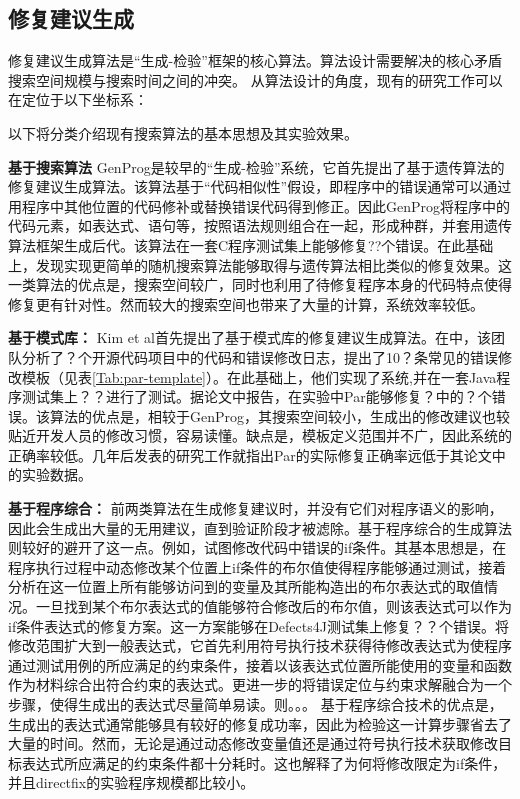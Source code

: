 \subsection{修复建议生成}
修复建议生成算法是“生成-检验”框架的核心算法。算法设计需要解决的核心矛盾搜索空间规模与搜索时间之间的冲突。
从算法设计的角度，现有的研究工作可以在定位于以下坐标系：


以下将分类介绍现有搜索算法的基本思想及其实验效果。

\textbf{基于搜索算法}
GenProg\cite{genprog}是较早的“生成-检验”系统，它首先提出了基于遗传算法的修复建议生成算法。该算法基于“代码相似性”假设，即程序中的错误通常可以通过用程序中其他位置的代码修补或替换错误代码得到修正。因此GenProg将程序中的代码元素，如表达式、语句等，按照语法规则组合在一起，形成种群，并套用遗传算法框架生成后代。该算法在一套C程序测试集上\cite{??}能够修复??个错误。在此基础上，\cite{RSRepair}发现实现更简单的随机搜索算法能够取得与遗传算法相比类似的修复效果。这一类算法的优点是，搜索空间较广，同时也利用了待修复程序本身的代码特点使得修复更有针对性。然而较大的搜索空间也带来了大量的计算，系统效率较低。

\textbf{基于模式库：}
Kim et al\cite{par}首先提出了基于模式库的修复建议生成算法。在\cite{patterns}中，该团队分析了？个开源代码项目中的代码和错误修改日志，提出了10？条常见的错误修改模板（见表\ref{Tab:par-template}）。在此基础上，他们实现了系统\cite{par},并在一套Java程序测试集上？？进行了测试。据论文中报告，在实验中Par能够修复？中的？个错误。该算法的优点是，相较于GenProg，其搜索空间较小，生成出的修改建议也较贴近开发人员的修改习惯，容易读懂。缺点是，模板定义范围并不广，因此系统的正确率较低。几年后发表的研究工作\cite{SPR}就指出Par的实际修复正确率远低于其论文中的实验数据。

\textbf{基于程序综合：}
前两类算法在生成修复建议时，并没有它们对程序语义的影响，因此会生成出大量的无用建议，直到验证阶段才被滤除。基于程序综合的生成算法则较好的避开了这一点。例如，\cite{nopol}试图修改代码中错误的if条件。其基本思想是，在程序执行过程中动态修改某个位置上if条件的布尔值使得程序能够通过测试，接着分析在这一位置上所有能够访问到的变量及其所能构造出的布尔表达式的取值情况。一旦找到某个布尔表达式的值能够符合修改后的布尔值，则该表达式可以作为if条件表达式的修复方案。这一方案能够在Defects4J测试集上修复？？个错误。\cite{semfix}将修改范围扩大到一般表达式，它首先利用符号执行技术获得待修改表达式为使程序通过测试用例的所应满足的约束条件，接着以该表达式位置所能使用的变量和函数作为材料综合出符合约束的表达式。\cite{directfix}更进一步的将错误定位与约束求解融合为一个步骤，使得生成出的表达式尽量简单易读。\cite{multi-fix}则。。。
基于程序综合技术的优点是，生成出的表达式通常能够具有较好的修复成功率，因此为检验这一计算步骤省去了大量的时间。然而，无论是通过动态修改变量值还是通过符号执行技术获取修改目标表达式所应满足的约束条件都十分耗时。这也解释了为何\cite{nopol}将修改限定为if条件，并且\cite{semfix}{directfix}的实验程序规模都比较小。

